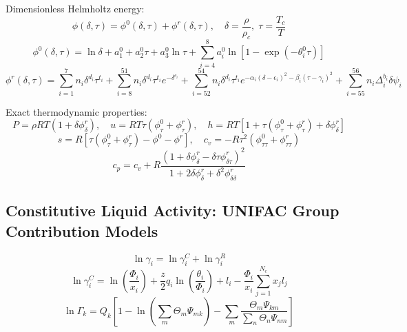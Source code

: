 \documentclass[11pt,a4paper]{article}
\begin{document}
Dimensionless Helmholtz energy:
\begin{equation}
\phi(\delta, \tau) = \phi^0(\delta, \tau) + \phi^r(\delta, \tau), \quad \delta = \frac{\rho}{\rho_c}, \; \tau = \frac{T_c}{T}
\end{equation}
\begin{equation}
\phi^0(\delta, \tau) = \ln \delta + a_1^0 + a_2^0 \tau + a_3^0 \ln \tau + \sum_{i=4}^8 a_i^0 \ln\left[ 1 - \exp(-\theta_i^0 \tau) \right]
\end{equation}
\begin{equation}
\phi^r(\delta, \tau) = \sum_{i=1}^7 n_i \delta^{d_i} \tau^{t_i} + \sum_{i=8}^{51} n_i \delta^{d_i} \tau^{t_i} e^{-\delta^{c_i}} + \sum_{i=52}^{54} n_i \delta^{d_i} \tau^{t_i} e^{-\alpha_i (\delta - \epsilon_i)^2 - \beta_i (\tau - \gamma_i)^2} + \sum_{i=55}^{56} n_i \Delta_i^{b_i} \delta \psi_i
\end{equation}

Exact thermodynamic properties:
\begin{equation}
P = \rho R T (1 + \delta \phi_\delta^r), \quad u = R T \tau (\phi_\tau^0 + \phi_\tau^r), \quad h = R T [1 + \tau(\phi_\tau^0 + \phi_\tau^r) + \delta \phi_\delta^r]
\end{equation}
\begin{equation}
s = R [\tau (\phi_\tau^0 + \phi_\tau^r) - \phi^0 - \phi^r], \quad c_v = -R \tau^2 (\phi_{\tau\tau}^0 + \phi_{\tau\tau}^r)
\end{equation}
\begin{equation}
c_p = c_v + R \frac{(1 + \delta \phi_\delta^r - \delta \tau \phi_{\delta\tau}^r)^2}{1 + 2\delta \phi_\delta^r + \delta^2 \phi_{\delta\delta}^r}
\end{equation}

\subsection{Constitutive Liquid Activity: UNIFAC Group Contribution Models}

\begin{equation}
\ln \gamma_i = \ln \gamma_i^C + \ln \gamma_i^R
\end{equation}
\begin{equation}
\ln \gamma_i^C = \ln \left( \frac{\Phi_i}{x_i} \right) + \frac{z}{2} q_i \ln \left( \frac{\theta_i}{\Phi_i} \right) + l_i - \frac{\Phi_i}{x_i} \sum_{j=1}^{N_c} x_j l_j
\end{equation}
\begin{equation}
\ln \Gamma_k = Q_k \left[ 1 - \ln \left( \sum_m \Theta_m \Psi_{mk} \right) - \sum_m \frac{\Theta_m \Psi_{km}}{\sum_n \Theta_n \Psi_{nm}} \right]
\end{equation}
\end{document}
